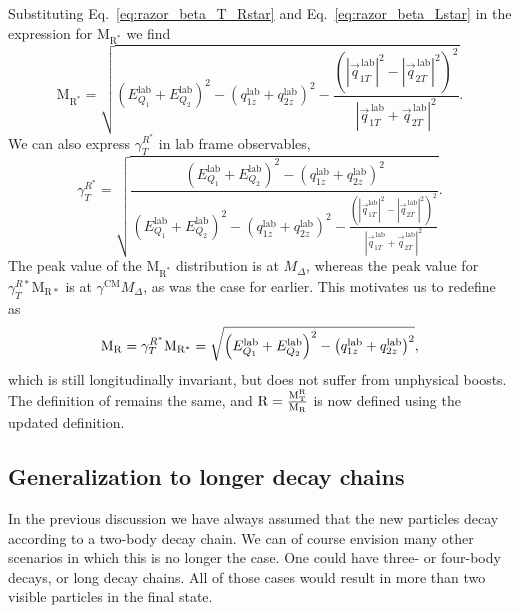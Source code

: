 Substituting Eq.~\ref{eq:razor_beta_T_Rstar} and Eq.~\ref{eq:razor_beta_Lstar} in the expression for
$\mathrm{M_{R^*}}$ we find
\begin{equation}
  \mathrm{M_{R^*}} = \sqrt{\left( E_{Q_1}^{\textrm{lab}} + E_{Q_2}^{\textrm{lab}}\right)^2 
                        - \left( q_{1z}^{\textrm{lab}} + q_{2z}^{\textrm{lab}} \right)^2 
                        - \frac{(|\vec{q}_{1T}^{\,\textrm{lab}}|^2 -
|\vec{q}_{2T}^{\,\textrm{lab}}|^2 )^2}{|\vec{q}_{1T}^{\,\textrm{lab}} +
\vec{q}_{2T}^{\,\textrm{lab}}|^2} } .
\end{equation}
We can also express $\gamma_T^{R^*}$ in lab frame observables,
\begin{equation}
  \gamma_T^{R^*} = \sqrt{ \frac{\left( E_{Q_1}^{\textrm{lab}} + E_{Q_2}^{\textrm{lab}}\right)^2 
                        - \left( q_{1z}^{\textrm{lab}} + q_{2z}^{\textrm{lab}} \right)^2 }
                              {\left( E_{Q_1}^{\textrm{lab}} + E_{Q_2}^{\textrm{lab}}\right)^2 
                        - \left( q_{1z}^{\textrm{lab}} + q_{2z}^{\textrm{lab}} \right)^2 
                        - \frac{(|\vec{q}_{1T}^{\textrm{lab}}|^2 -
|\vec{q}_{2T}^{\,\textrm{lab}}|^2 )^2}{|\vec{q}_{1T}^{\,\textrm{lab}} +
\vec{q}_{2T}^{\,\textrm{lab}}|^2}}} . 
\end{equation}
The peak value of the $\mathrm{M_{R^*}}$ distribution is at $M_\Delta$, whereas the peak value for
$\gamma_T^{R*}\mathrm{M_{R*}}$ is at $\gamma^{\textrm{CM}}M_\Delta$, as was the case for \mr
earlier. This motivates us to redefine \mr as
\begin{equation}
  \mathrm{M_R} = \gamma_T^{R^*}\mathrm{M_{R^*}} = \sqrt{\left( E_{Q_1}^{\textrm{lab}} +
E_{Q_2}^{\textrm{lab}}\right)^2 - \left( q_{1z}^{\textrm{lab}} +
q_{2z}^{\textrm{lab}} \right)^2} ,
\end{equation}
which is still longitudinally invariant, but does not suffer from unphysical boosts.
The definition of \mtr remains the same, and $\mathrm{R} = \frac{\mathrm{M_T^R}}{\mathrm{M_R}}$ is now defined using
the updated \mr definition.


\subsection{Generalization to longer decay chains \label{sec:razor_megajet_algorithm}}

In the previous discussion we have always assumed that the new particles decay according to a
two-body decay chain. We can of course envision many other scenarios in which this is no longer the
case. One could have three- or four-body decays, or long decay chains. All of those cases would
result in more than two visible particles in the final state. 

